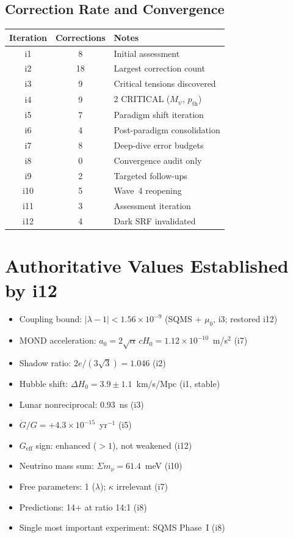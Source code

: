 \documentclass[11pt,a4paper]{article}
\begin{document}
\subsection{Correction Rate and Convergence}

\begin{center}
\begin{tabular}{ccl}
\toprule
\textbf{Iteration} & \textbf{Corrections} & \textbf{Notes} \\
\midrule
i1 & 8 & Initial assessment \\
i2 & 18 & Largest correction count \\
i3 & 9 & Critical tensions discovered \\
i4 & 9 & 2 CRITICAL ($M_\psi$, $p_\mathrm{th}$) \\
i5 & 7 & Paradigm shift iteration \\
i6 & 4 & Post-paradigm consolidation \\
i7 & 8 & Deep-dive error budgets \\
i8 & 0 & Convergence audit only \\
i9 & 2 & Targeted follow-ups \\
i10 & 5 & Wave~4 reopening \\
i11 & 3 & Assessment iteration \\
i12 & 4 & Dark SRF invalidated \\
\bottomrule
\end{tabular}
\end{center}


\section{Authoritative Values Established by i12}

\begin{itemize}[nosep]
\item Coupling bound: $|\lambda-1|<1.56\times10^{-9}$ (SQMS + $\mu_0$, i3; restored i12)
\item MOND acceleration: $a_0=2\sqrt{\alpha}\,cH_0=1.12\times10^{-10}$~m/s$^2$ (i7)
\item Shadow ratio: $2e/(3\sqrt{3})=1.046$ (i2)
\item Hubble shift: $\Delta H_0=3.9\pm1.1$~km/s/Mpc (i1, stable)
\item Lunar nonreciprocal: 0.93~ns (i3)
\item $\dot{G}/G = +4.3\times10^{-15}$~yr$^{-1}$ (i5)
\item $G_\mathrm{eff}$ sign: enhanced ($>1$), not weakened (i12)
\item Neutrino mass sum: $\Sigma m_\nu = 61.4$~meV (i10)
\item Free parameters: 1 ($\lambda$); $\kappa$ irrelevant (i7)
\item Predictions: 14+ at ratio 14:1 (i8)
\item Single most important experiment: SQMS Phase~I (i8)
\end{itemize}
\end{document}
